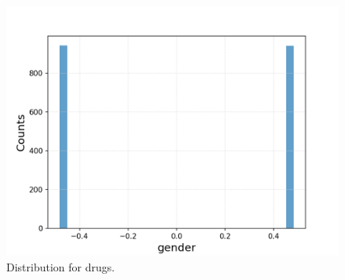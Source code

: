 \documentclass{article}
\begin{document}
\begin{figure}[h!]
\begin{minipage}[b]{0.32\textwidth}
	\end{minipage}
	\begin{minipage}[b]{0.32\textwidth}
		\includegraphics[width=\textwidth]{plots/drugsPlots/gender.png}
	\end{minipage}
	\caption{Distribution for drugs.}
	\label{drugs2}
\end{figure}
\end{document}
